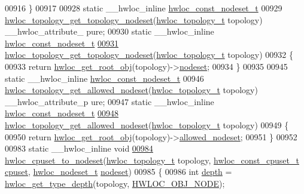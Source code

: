 \begin{DoxyCode}
00916 \}
00917 
00928 \textcolor{keyword}{static} \_\_hwloc\_inline \hyperlink{a00040_ga2f5276235841ad66a79bedad16a5a10c}{hwloc_const_nodeset_t}
00929 \hyperlink{a00061_ga78f80a3c04718ca273791a1071512031}{hwloc_topology_get_topology_nodeset}(\hyperlink{a00039_ga9d1e76ee15a7dee158b786c30b6a6e38}{hwloc_topology_t} topology) \_\_hwloc\_attribute\_
      pure;
00930 \textcolor{keyword}{static} \_\_hwloc\_inline \hyperlink{a00040_ga2f5276235841ad66a79bedad16a5a10c}{hwloc_const_nodeset_t}
\hypertarget{a00031_source_l00931}{}\hyperlink{a00061_ga78f80a3c04718ca273791a1071512031}{00931} \hyperlink{a00061_ga78f80a3c04718ca273791a1071512031}{hwloc_topology_get_topology_nodeset}(\hyperlink{a00039_ga9d1e76ee15a7dee158b786c30b6a6e38}{hwloc_topology_t} topology)
00932 \{
00933   \textcolor{keywordflow}{return} \hyperlink{a00053_gadbf58f6e187efbdb3cd9a8e30311b7d7}{hwloc_get_root_obj}(topology)->\hyperlink{a00016_a08f0d0e16c619a6e653526cbee4ffea3}{nodeset};
00934 \}
00935 
00945 \textcolor{keyword}{static} \_\_hwloc\_inline \hyperlink{a00040_ga2f5276235841ad66a79bedad16a5a10c}{hwloc_const_nodeset_t}
00946 \hyperlink{a00061_ga13915b8e074f59fbdf8f973739509293}{hwloc_topology_get_allowed_nodeset}(\hyperlink{a00039_ga9d1e76ee15a7dee158b786c30b6a6e38}{hwloc_topology_t} topology) \_\_hwloc\_attribute\_p
      ure;
00947 \textcolor{keyword}{static} \_\_hwloc\_inline \hyperlink{a00040_ga2f5276235841ad66a79bedad16a5a10c}{hwloc_const_nodeset_t}
\hypertarget{a00031_source_l00948}{}\hyperlink{a00061_ga13915b8e074f59fbdf8f973739509293}{00948} \hyperlink{a00061_ga13915b8e074f59fbdf8f973739509293}{hwloc_topology_get_allowed_nodeset}(\hyperlink{a00039_ga9d1e76ee15a7dee158b786c30b6a6e38}{hwloc_topology_t} topology)
00949 \{
00950   \textcolor{keywordflow}{return} \hyperlink{a00053_gadbf58f6e187efbdb3cd9a8e30311b7d7}{hwloc_get_root_obj}(topology)->\hyperlink{a00016_a19e3d0a5951a7510fc4fc4722a9bf531}{allowed_nodeset};
00951 \}
00952 
00983 \textcolor{keyword}{static} \_\_hwloc\_inline \textcolor{keywordtype}{void}
\hypertarget{a00031_source_l00984}{}\hyperlink{a00062_ga60ecc4ae480c28b5fbd34aca4fc37daa}{00984} \hyperlink{a00062_ga60ecc4ae480c28b5fbd34aca4fc37daa}{hwloc_cpuset_to_nodeset}(\hyperlink{a00039_ga9d1e76ee15a7dee158b786c30b6a6e38}{hwloc_topology_t} topology, \hyperlink{a00040_ga1f784433e9b606261f62d1134f6a3b25}{hwloc_const_cpuset_t} \hyperlink{a00016_a67925e0f2c47f50408fbdb9bddd0790f}{cpuset}, 
      \hyperlink{a00040_ga37e35730fa7e775b5bb0afe893d6d508}{hwloc_nodeset_t} \hyperlink{a00016_a08f0d0e16c619a6e653526cbee4ffea3}{nodeset})
00985 \{
00986         \textcolor{keywordtype}{int} \hyperlink{a00016_a9d82690370275d42d652eccdea5d3ee5}{depth} = \hyperlink{a00046_gaea7c64dd59467f5201ba87712710b14d}{hwloc_get_type_depth}(topology, \hyperlink{a00041_ggacd37bb612667dc437d66bfb175a8dc55aaf0964881117bdedf1a5e9332cd120dd}{HWLOC_OBJ_NODE});

\end{DoxyCode}
